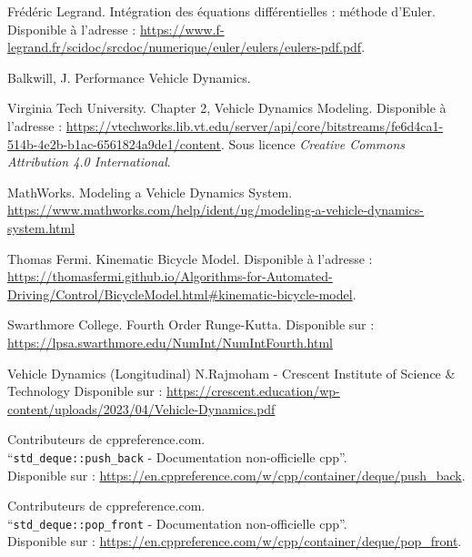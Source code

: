 \documentclass[a4paper,12pt]{report}
\begin{document}
    \begin{thebibliography}{9}
        Frédéric Legrand.
        Intégration des équations différentielles : méthode d'Euler.
        Disponible à l'adresse : \url{https://www.f-legrand.fr/scidoc/srcdoc/numerique/euler/eulers/eulers-pdf.pdf}.

        Balkwill, J.
        Performance Vehicle Dynamics.

        Virginia Tech University.
        Chapter 2, Vehicle Dynamics Modeling.
        Disponible à l'adresse : \url{https://vtechworks.lib.vt.edu/server/api/core/bitstreams/fe6d4ca1-514b-4e2b-b1ac-6561824a9de1/content}.
        Sous licence \textit{Creative Commons Attribution 4.0 International}.

        MathWorks.
        Modeling a Vehicle Dynamics System.
        \url{https://www.mathworks.com/help/ident/ug/modeling-a-vehicle-dynamics-system.html}

        Thomas Fermi.
        Kinematic Bicycle Model.
        Disponible à l'adresse : \url{https://thomasfermi.github.io/Algorithms-for-Automated-Driving/Control/BicycleModel.html#kinematic-bicycle-model}.

        Swarthmore College.
        Fourth Order Runge-Kutta.
        Disponible sur : \url{https://lpsa.swarthmore.edu/NumInt/NumIntFourth.html}

        Vehicle Dynamics (Longitudinal)
        N.Rajmoham - Crescent Institute of Science \& Technology
        Disponible sur : \url{https://crescent.education/wp-content/uploads/2023/04/Vehicle-Dynamics.pdf}

        Contributeurs de cppreference.com. \\
        ``\texttt{\gls{std_deque}::push\_back} - Documentation non-officielle \gls{cpp}''. \\
        Disponible sur : \url{https://en.cppreference.com/w/cpp/container/deque/push_back}.

        Contributeurs de cppreference.com.\\
        ``\texttt{\gls{std_deque}::pop\_front} - Documentation non-officielle \gls{cpp}''.\\
        Disponible sur : \url{https://en.cppreference.com/w/cpp/container/deque/pop_front}.


\end{thebibliography}
\end{document}
